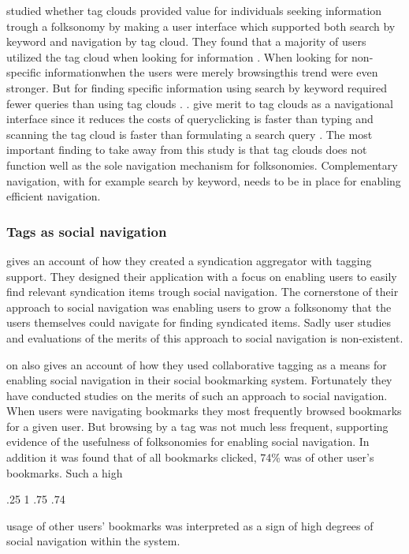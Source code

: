 \citet[]{sinclair08} studied whether tag clouds provided
value for individuals seeking information trough a folksonomy by making a
user interface which supported both search by keyword and navigation by tag
cloud. They found that a majority of users utilized the
tag cloud when looking for information \citeyearpar[]{sinclair08}.
When looking for non-specific information\dash{}when the users were merely
browsing\dash{}this trend were even stronger. But for finding specific
information using  search by keyword required fewer queries than using tag
clouds \citeyearpar[]{sinclair08}. \citeauthor{sinclair08}.
give merit to tag clouds as a navigational interface since it
reduces the costs of query\dash{}clicking is faster than typing and scanning
the tag cloud is faster than formulating a search query
\citeyearpar[]{sinclair08}. The most important finding to take away from
this study is that tag clouds does not function well as the sole navigation
mechanism for folksonomies. Complementary navigation, with for example search
by keyword, needs to be in place for enabling efficient navigation.

\subsubsection{Tags as social navigation}

\citet{jarrett05} gives an account of how they created a syndication
aggregator with tagging support. They designed their application with a focus
on enabling users to easily find relevant syndication items trough
social navigation. The cornerstone of their approach to social navigation was
enabling users to grow a folksonomy that the users themselves could navigate
for finding syndicated items. Sadly user studies and evaluations
of the merits of this approach to social navigation is non-existent.

\citet{millen06} on also gives an account of how they used collaborative
tagging as a means for enabling social navigation in their
 social bookmarking system. Fortunately they have conducted
studies on the merits of such an approach to social navigation. When users
were navigating bookmarks they most frequently browsed bookmarks for a given
user. But browsing by a tag was not much less frequent, supporting evidence of
the usefulness of folksonomies for enabling social navigation. In addition
it was found that of all bookmarks clicked, 74\% was of other user's
bookmarks. Such a high
\begin{sparkline}{3}
  \sparkspike .25  1
  \sparkspike .75  .74
\end{sparkline}
usage of other users' bookmarks was interpreted as a sign of high degrees of
social navigation within the system.

